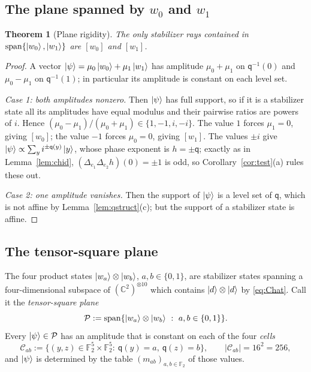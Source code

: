 \documentclass[11pt]{article}
\theoremstyle{plain}
\newtheorem{theorem}{Theorem}[section]
\theoremstyle{definition}
\newcommand{\F}{\mathbb{F}}
\newcommand{\C}{\mathbb{C}}
\newcommand{\qq}{\mathsf{q}}
\newcommand{\spn}{\operatorname{span}}
\begin{document}
\subsection{The plane spanned by $w_0$ and $w_1$}

\begin{theorem}[Plane rigidity]\label{thm:plane}
The only stabilizer rays contained in $\spn\{\ket{w_0},\ket{w_1}\}$ are $[w_0]$ and
$[w_1]$.
\end{theorem}

\begin{proof}
A vector $\ket\psi=\mu_0\ket{w_0}+\mu_1\ket{w_1}$ has amplitude $\mu_0+\mu_1$ on
$\qq^{-1}(0)$ and $\mu_0-\mu_1$ on $\qq^{-1}(1)$; in particular its amplitude is
constant on each level set.

\emph{Case 1: both amplitudes nonzero.} Then $\ket\psi$ has full support, so if it is a
stabilizer state all its amplitudes have equal modulus and their pairwise ratios are
powers of $i$. Hence $(\mu_0-\mu_1)/(\mu_0+\mu_1)\in\{1,-1,i,-i\}$. The value $1$ forces
$\mu_1=0$, giving $[w_0]$; the value $-1$ forces $\mu_0=0$, giving $[w_1]$. The values
$\pm i$ give $\ket\psi\propto\sum_yi^{\pm\qq(y)}\ket y$, whose phase exponent is
$h=\pm\qq$; exactly as in Lemma~\ref{lem:chid},
$(\Delta_{e_1}\Delta_{e_2}h)(0)=\pm1$ is odd, so Corollary~\ref{cor:test}(a) rules
these out.

\emph{Case 2: one amplitude vanishes.} Then the support of $\ket\psi$ is a level set of
$\qq$, which is not affine by Lemma~\ref{lem:qstruct}(c); but the support of a
stabilizer state is affine.
\end{proof}

\subsection{The tensor-square plane}

The four product states $\ket{w_a}\otimes\ket{w_b}$, $a,b\in\{0,1\}$, are stabilizer
states spanning a four-dimensional subspace of $(\C^2)^{\otimes 10}$ which contains
$\ket d\otimes\ket d$ by \eqref{eq:Chat}. Call it the \emph{tensor-square plane}
\[
\mathcal P:=\spn\{\ket{w_a}\otimes\ket{w_b}\ :\ a,b\in\{0,1\}\}.
\]
Every $\ket\psi\in\mathcal P$ has an amplitude that is constant on each of the four
\emph{cells}
\[
\mathcal C_{ab}:=\{(y,z)\in\F_2^5\times\F_2^5:\ \qq(y)=a,\ \qq(z)=b\},
\qquad |\mathcal C_{ab}|=16^2=256,
\]
and $\ket\psi$ is determined by the table $(m_{ab})_{a,b\in\F_2}$ of those values.
\end{document}
